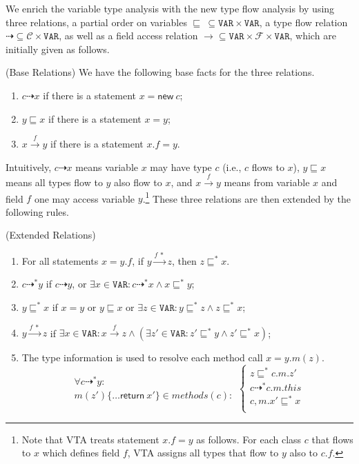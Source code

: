 \documentclass{llncs}
\newcommand{\keyword}[1]{\mathsf{#1}}
\newcommand{\kw}[1]{\keyword{#1}}
\newcommand{\kwnew}[0]{\keyword{new}}
\newcommand\Var{\mathtt{VAR}}
\newcommand{\Class}{\mathcal{C}}
\newcommand{\Field}{\mathcal{F}}
\newcommand{\less}{\sqsubseteq}
\newcommand{\tflow}{\dashrightarrow}
\newcommand{\hflow}{\longrightarrow}
\newcommand{\lhflow}[1]{\stackrel{#1}{\hflow}}
\begin{document}
We enrich the variable type analysis with the new type flow analysis by using three relations,
a partial order on variables $\less\ \subseteq\Var\times\Var$, a type flow relation
$\tflow\subseteq\Class\times\Var$, as well as a field access relation $\hflow\subseteq\Var\times\Field\times\Var$,
which are initially given as follows.
\begin{definition}\label{def:base} (Base Relations)
We have the following base facts for the three relations.
\begin{enumerate}
  \item $c\tflow x$ if there is a statement $x = \kwnew\ c$;
  \item $y\less x$ if there is a statement $x = y $;
  \item $x\lhflow{f}y$ if there is a statement $x.f = y$.  %
\end{enumerate}
\end{definition}
Intuitively, $c\tflow x$ means variable $x$ may have type $c$ (i.e., $c$ flows to $x$), $y\less x$ means all types flow to $y$ also flow to $x$, and $x\lhflow{f}y$ means from variable $x$ and field $f$ one may access variable $y$.\footnote{Note that VTA treats statement $x.f = y$ as follows. For each class $c$ that flows to $x$ which defines field $f$, VTA assigns all types that flow to $y$ also to $c.f$.} These three relations are then extended by the following rules.
\begin{definition}\label{def:extension} (Extended Relations)
\begin{enumerate}
  \item For all statements $x = y.f $, if $y\lhflow{f\ *}z$, then $z\less^* x$.
  \item $c\tflow^* y$ if $c\tflow y$, or $\exists x\in\Var:c\tflow^* x\wedge x\less^* y$;
  \item $y\less^* x$ if $x=y$ or $y\less x$ or $\exists z\in\Var:y\less^* z\wedge z\less^* x$;
  \item $y\lhflow{f\ *}z$ if $\exists x\in\Var: x\lhflow{f}z\wedge (\exists z'\in\Var: z'\less^* y \wedge z'\less^*x)$;
  \item The type information is used to resolve each method call $x = y.m(z)$.
  \begin{equation*}
  \left.\begin{array}{l}\forall c\tflow^* y:\\ m(z')\{\dots \kw{return}\ x'\}\in methods(c):\end{array}\right.\left\{\begin{array}{l}
        z\less^* c.m.z'\\
        c\tflow^* c.m.this\\
        c,m.x'\less^* x \\
        \end{array}\right.
  \end{equation*}
\end{enumerate}
\end{definition}
\end{document}
